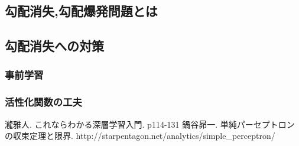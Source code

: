 \documentclass[twocolumn]{jarticle}
\begin{document}
\subsection{勾配消失,勾配爆発問題とは}
\subsection{勾配消失への対策}
\subsubsection{事前学習}
\subsubsection{活性化関数の工夫}

\begin{thebibliography}{9}
   瀧雅人. これならわかる深層学習入門. p114-131
   鍋谷昴一. 単純パーセプトロンの収束定理と限界. http://starpentagon.net/analytics/simple\_perceptron/
\end{thebibliography}
\end{document}
